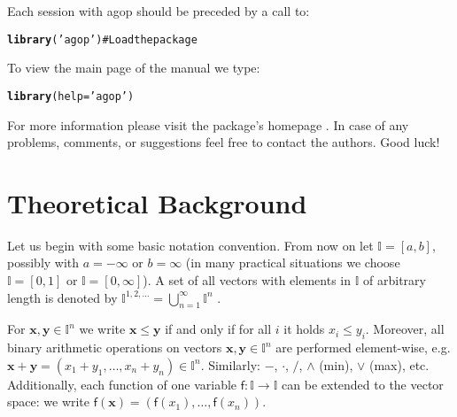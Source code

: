 \documentclass[11pt]{article}\usepackage{graphicx, color}
\makeatletter
\newcommand{\hlfunctioncall}[1]{\textcolor[rgb]{0.501960784313725,0,0.329411764705882}{\textbf{#1}}}%
\newcommand{\hlstring}[1]{\textcolor[rgb]{0.6,0.6,1}{#1}}%
\newcommand{\hlcomment}[1]{\textcolor[rgb]{0.180392156862745,0.6,0.341176470588235}{#1}}%
\newenvironment{kframe}{%
 \def\at@end@of@kframe{}%
 \ifinner\ifhmode%
  \def\at@end@of@kframe{\end{minipage}}%
  \begin{minipage}{\columnwidth}%
 \fi\fi%
 \def\FrameCommand##1{\hskip\@totalleftmargin \hskip-\fboxsep
 \colorbox{shadecolor}{##1}\hskip-\fboxsep
     \hskip-\linewidth \hskip-\@totalleftmargin \hskip\columnwidth}%
 \MakeFramed {\advance\hsize-\width
   \@totalleftmargin\z@ \linewidth\hsize
   \@setminipage}}%
 {\par\unskip\endMakeFramed%
 \at@end@of@kframe}
\newenvironment{knitrout}{}{} %
\newcommand{\package}[1]{\textsf{#1}\xspace}
\newcommand{\vect}[1]{{\mathbf{#1}}}
\newcommand{\func}[1]{{\mathsf{#1}}}
\newcommand{\Ival}{\mathbb{I}}
\newcommand{\IvalPow}[1]{\mathbb{I}^{#1}}
\newcommand{\AnyPow}{^{1,2,\dots}}
\newcommand{\IvalAnyPow}{\mathbb{I}\AnyPow}
\theoremstyle{remark}
\theoremstyle{definition}
\makeatother
\begin{document}
\bigskip
Each session with \package{agop} should be preceded by
a call to:

\begin{knitrout}\small
{}\color{fgcolor}\begin{kframe}
\begin{alltt}
\hlfunctioncall{library}(\hlstring{'agop'}) \hlcomment{# Load the package}
\end{alltt}
\end{kframe}
\end{knitrout}


\bigskip
To view the main page of the manual we type:

\begin{knitrout}\small
{}\color{fgcolor}\begin{kframe}
\begin{alltt}
\hlfunctioncall{library}(help=\hlstring{'agop'})
\end{alltt}
\end{kframe}
\end{knitrout}


\noindent
For more information please visit the package's homepage \cite{agopHome}.
In case of any problems, comments, or suggestions feel free to contact the authors.
Good luck!







\section{Theoretical Background}

Let us begin with some basic notation convention. 
From now on let $\Ival=[a,b]$, possibly with $a=-\infty$ or $b=\infty$
(in many practical situations we choose $\Ival=[0,1]$ or $\Ival=[0,\infty]$).
A set of all vectors with elements in $\Ival$ of arbitrary length 
is denoted by $\IvalAnyPow=\bigcup_{n=1}^\infty \IvalPow{n}$ .

For $\vect{x},\vect{y}\in\IvalPow{n}$
we write $\vect{x}\le\vect{y}$ if and only if for all $i$ it holds $x_i\le y_i$.
Moreover, all binary arithmetic operations on vectors $\vect{x},\vect{y}\in\IvalPow{n}$
are performed element-wise,
e.g. $\vect{x}+\vect{y}=(x_1+y_1,\dots,x_n+y_n)\in\IvalPow{n}$.
Similarly: $-$, $\cdot$, $/$, $\wedge$ (min), $\vee$ (max), etc.
Additionally, each function of one variable
$\func{f}:\Ival\to\Ival$ can be extended to the vector
space: we write $\func{f}(\vect{x})=(\func{f}(x_1), \dots, \func{f}(x_n))$.
\end{document}

